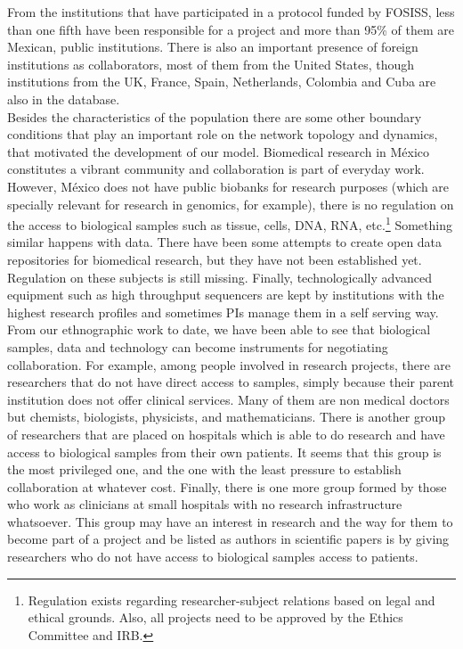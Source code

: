 \documentclass[11pt]{article}
\begin{document}
From the institutions that have participated in a protocol funded by FOSISS,
less than one fifth have been responsible for a project and more than 95\% of
them are Mexican, public institutions. There is also an important presence of
foreign institutions as collaborators, most of them from the United States,
though institutions from the UK, France, Spain, Netherlands, Colombia and Cuba
are also in the database.\\ 

Besides the characteristics of the population there are some other boundary
conditions that play an important role on the network topology and dynamics,
that motivated the development of our model. Biomedical research in M\'exico
constitutes a vibrant community and collaboration is part of everyday
work. However, M\'exico does not have public biobanks for research purposes
(which are specially relevant for research in genomics, for example), there is
no regulation on the access to biological samples such as tissue, cells, DNA,
RNA, etc.\footnote{Regulation exists regarding researcher-subject relations
  based on legal and ethical grounds. Also, all projects need to be approved by
  the Ethics Committee and IRB.} Something similar happens with data. There have
been some attempts to create open data repositories for biomedical research, but
they have not been established yet. Regulation on these subjects is still
missing. Finally, technologically advanced equipment such as high throughput sequencers
are kept by institutions with the highest research
profiles and sometimes PIs manage them in a self serving way.\\  

From our ethnographic work to date, we have been able to see that
biological samples, data and technology can become instruments for negotiating
collaboration. For example, among people involved in research projects, there
are researchers that do not have direct access to samples, simply because their
parent institution does not offer clinical services. Many of them are non medical
doctors but chemists, biologists, physicists, and mathematicians. There is
another group of researchers that are placed on hospitals which is able to do
research and have access to biological samples from their own patients. It seems
that this group is the most privileged one, and the one with the least pressure to establish
collaboration at whatever cost. Finally, there is one more group formed by those
who work as clinicians at small hospitals with no research infrastructure
whatsoever. This group may have an interest in research and the way for them to
become part of a project and be listed as authors in scientific papers is by
giving researchers who do not have access to biological samples access to
patients.\\
\end{document}
